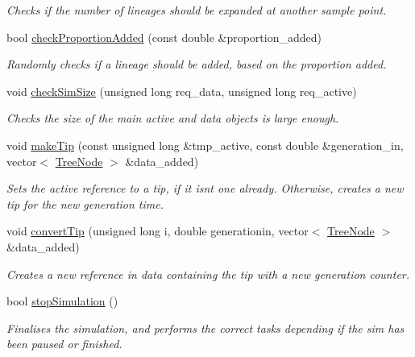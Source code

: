 \begin{DoxyCompactItemize}
\begin{DoxyCompactList}\small\item\em Checks if the number of lineages should be expanded at another sample point. \end{DoxyCompactList}\item 
bool \hyperlink{class_tree_aa3eef7c7e66a975d1dfd1a0a0148e037}{check\+Proportion\+Added} (const double \&proportion\+\_\+added)
\begin{DoxyCompactList}\small\item\em Randomly checks if a lineage should be added, based on the proportion added. \end{DoxyCompactList}\item 
void \hyperlink{class_tree_ab8a62d0ca2b1746676073e3f33e2a949}{check\+Sim\+Size} (unsigned long req\+\_\+data, unsigned long req\+\_\+active)
\begin{DoxyCompactList}\small\item\em Checks the size of the main active and data objects is large enough. \end{DoxyCompactList}\item 
void \hyperlink{class_tree_a3fa6fbeeb00d1661958f8e358796251c}{make\+Tip} (const unsigned long \&tmp\+\_\+active, const double \&generation\+\_\+in, vector$<$ \hyperlink{class_tree_node}{Tree\+Node} $>$ \&data\+\_\+added)
\begin{DoxyCompactList}\small\item\em Sets the active reference to a tip, if it isn\textquotesingle{}t one already. Otherwise, creates a new tip for the new generation time. \end{DoxyCompactList}\item 
void \hyperlink{class_tree_a370a23cfb08fd27ed1862bdfa605c5b8}{convert\+Tip} (unsigned long i, double generationin, vector$<$ \hyperlink{class_tree_node}{Tree\+Node} $>$ \&data\+\_\+added)
\begin{DoxyCompactList}\small\item\em Creates a new reference in data containing the tip with a new generation counter. \end{DoxyCompactList}\item 
bool \hyperlink{class_tree_afd6bd75c301d2f57c4997fcfc92f192e}{stop\+Simulation} ()
\begin{DoxyCompactList}\small\item\em Finalises the simulation, and performs the correct tasks depending if the sim has been paused or finished. \end{DoxyCompactList}\item 

\end{DoxyCompactItemize}
